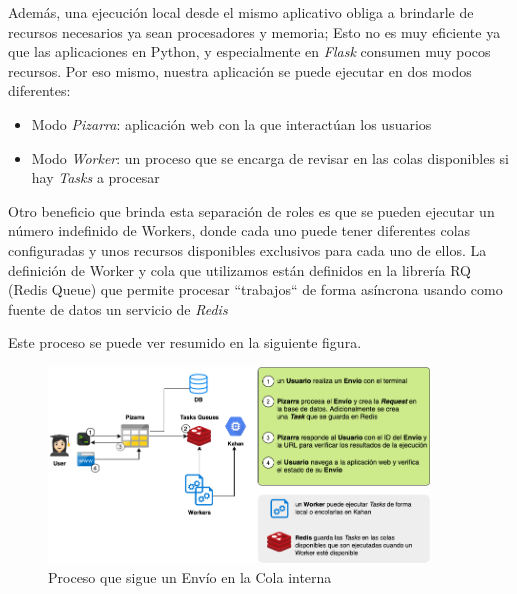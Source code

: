 \documentclass[11pt,spanish,listoffigures,listoftables]{tfgetsinf}
\begin{document}

Además, una ejecución local desde el mismo aplicativo obliga a brindarle de recursos necesarios ya sean procesadores y memoria; Esto no es muy eficiente ya que las aplicaciones en Python, y especialmente en \textit{Flask} consumen muy pocos recursos. Por eso mismo, nuestra aplicación se puede ejecutar en dos modos diferentes:

\begin{itemize}
	\item Modo \textit{Pizarra}: aplicación web con la que interactúan los usuarios
	\item Modo \textit{Worker}: un proceso que se encarga de revisar en las colas disponibles si hay \textit{Tasks} a procesar
\end{itemize}

Otro beneficio que brinda esta separación de roles es que se pueden ejecutar un número indefinido de \foreignlanguage{english}{Workers}, donde cada uno puede tener diferentes colas configuradas y unos recursos disponibles exclusivos para cada uno de ellos. La definición de  \foreignlanguage{english}{Worker} y \Gls{cola} que utilizamos están definidos en la librería RQ (Redis Queue) que permite procesar ``trabajos`` de forma asíncrona usando como fuente de datos un servicio de \textit{Redis}

Este proceso se puede ver resumido en la siguiente figura.

\begin{figure}[ht]
	\centering
	\includegraphics[width=0.90\textwidth]{img/queues}
	\caption[Proceso que sigue un Envío en la Cola interna]{Proceso que sigue un Envío en la Cola interna}
	\label{figura:queues}
\end{figure}
\end{document}
